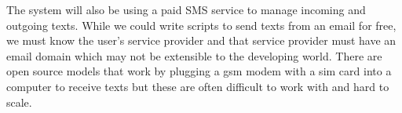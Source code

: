 The system will also be using a paid SMS service to manage incoming and outgoing texts. While we could write scripts to send texts from an email for free, we must know the user’s service provider and that service provider must have an email domain which may not be extensible to the developing world. There are open source models that work by plugging a gsm modem with a sim card into a computer to receive texts but these are often difficult to work with and hard to scale.
